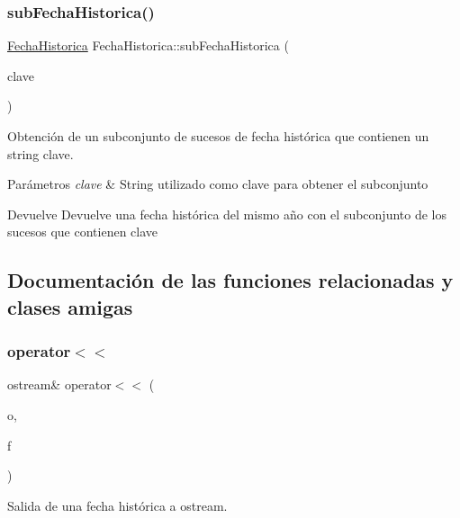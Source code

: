 \subsubsection{\texorpdfstring{sub\+Fecha\+Historica()}{subFechaHistorica()}}
{\footnotesize\ttfamily \hyperlink{classFechaHistorica}{Fecha\+Historica} Fecha\+Historica\+::sub\+Fecha\+Historica (\begin{DoxyParamCaption}\item[{const string}]{clave }\end{DoxyParamCaption})}



Obtención de un subconjunto de sucesos de fecha histórica que contienen un string clave. 


\begin{DoxyParams}{Parámetros}
{\em clave} & String utilizado como clave para obtener el subconjunto \\
\hline
\end{DoxyParams}
\begin{DoxyReturn}{Devuelve}
Devuelve una fecha histórica del mismo año con el subconjunto de los sucesos que contienen clave 
\end{DoxyReturn}


\subsection{Documentación de las funciones relacionadas y clases amigas}
\mbox{\label{classFechaHistorica_a5d5e8ff6e1e1f5fe49529f665e2fe5c7}} 
\subsubsection{\texorpdfstring{operator$<$$<$}{operator<<}}
{\footnotesize\ttfamily ostream\& operator$<$$<$ (\begin{DoxyParamCaption}\item[{ostream \&}]{o,  }\item[{const \hyperlink{classFechaHistorica}{Fecha\+Historica} \&}]{f }\end{DoxyParamCaption})\hspace{0.3cm}{\ttfamily [friend]}}



Salida de una fecha histórica a ostream. 


